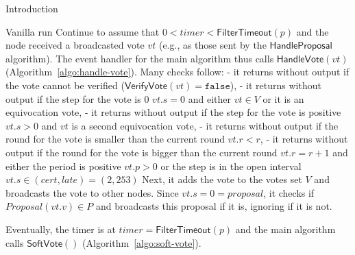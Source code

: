 \documentclass[10pt,a4paper]{article}
\begin{document}
\begin{section}{Introduction}
\begin{subsection}{Vanilla run}
Continue to assume that $0<timer<\mathsf{FilterTimeout}(p)$ and the node received a broadcasted vote 
$vt$ (e.g., as those sent by the $\mathsf{HandleProposal}$ algorithm).
The event handler for the main algorithm thus calls $\mathsf{HandleVote}(vt)$ (Algorithm~\ref{algo:handle-vote}).
Many checks follow:
- it returns without output if the vote cannot be verified ($\mathsf{VerifyVote}(vt)=\mathtt{false}$),
- it returns without output if the step for the vote is 0 $vt.s=0$ and either $vt\in V$ or it is an equivocation vote, 
- it returns without output if the step for the vote is positive $vt.s>0$ and $vt$ is a second equivocation vote, 
- it returns without output if the round for the vote is smaller than the current round $vt.r<r$,
- it returns without output if the round for the vote is bigger than the current round $vt.r=r+1$
and either the period is positive $vt.p>0$ or the step is in the open interval $vt.s\in(cert, late)=(2,253)$
Next, it adds the vote to the votes set $V$ and broadcasts the vote to other nodes.
Since $vt.s=0=proposal$, it checks if $Proposal(vt.v)\in P$ and broadcasts this proposal
if it is, ignoring if it is not.


Eventually, the timer is at $timer=\mathsf{FilterTimeout}(p)$ and the main algorithm calls 
$\mathsf{SoftVote()}$ (Algorithm~\ref{algo:soft-vote}).


\end{subsection}
\end{section}
\end{document}
